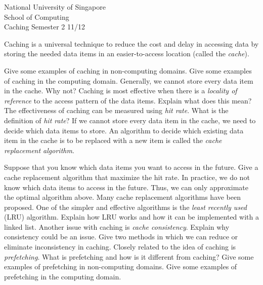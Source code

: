 \documentclass[answers,a4paper,11pt]{exam}
\begin{document}
\extraheadheight{.5in}
%
{\large\sf National University of Singapore\\ School of Computing \\
\LARGE\sf Caching}%
{\large\sf Semester 2 11/12}
\firstpageheadrule
\pagestyle{headandfoot}

Caching is a universal technique to reduce the cost and delay in accessing data by storing the needed data items in an easier-to-access location (called the \textit{cache}).
\begin{questions}
\question
Give some examples of caching in non-computing domains.
\fillwithdottedlines{1in}
\question
Give some examples of caching in the computing domain.
\fillwithdottedlines{2in}
\question
Generally, we cannot store every data item in the cache.  Why not?
\fillwithdottedlines{1in}
\question
Caching is most effective when there is a \textit{locality of reference} to the access pattern of the data items.  Explain what does this mean?
\fillwithdottedlines{2in}
\question
The effectiveness of caching can be measured using \textit{hit rate}.  What is the definition of \textit{hit rate}?
\fillwithdottedlines{1in}
\question
If we cannot store every data item in the cache, we need to decide which data items to store.  An algorithm to decide which existing data item in the cache is to be replaced with a new item is called the \textit{cache replacement algorithm}.  

Suppose that you know which data items you want to access in the future.  Give a cache replacement algorithm that maximize the hit rate.
\fillwithdottedlines{2in}
\question
In practice, we do not know which data items to access in the future.  Thus, we can only approximate the optimal algorithm above.  Many cache replacement algorithms have been proposed.  One of the simpler and effective algorithms is the \textit{least recently used} (LRU) algorithm.  Explain how LRU works and how it can be implemented with a linked list. 
\fillwithdottedlines{2in}
\question
Another issue with caching is \textit{cache consistency}.  Explain why consistency could be an issue.
\fillwithdottedlines{1in}
\question
Give two methods in which we can reduce or eliminate inconsistency in caching.
\fillwithdottedlines{2in}
\question
Closely related to the idea of caching is \textit{prefetching}.  What is prefetching and how is it different from caching?
\fillwithdottedlines{1in}
\question
Give some examples of prefetching in non-computing domains.
\fillwithdottedlines{1in}
\question
Give some examples of prefetching in the computing domain.
\fillwithdottedlines{2in}

\end{questions}
\end{document}
